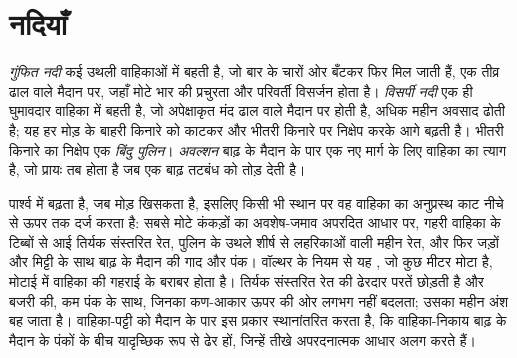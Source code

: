 \section{नदियाँ}\label{sec:b3:facies-models:rivers}

\begin{definition}[गुंफित और विसर्पी नदियाँ]\label{def:b3:facies-models:rivers}
\emph{गुंफित नदी} कई उथली वाहिकाओं में बहती है, जो बार के चारों ओर बँटकर फिर मिल जाती हैं,
एक तीव्र ढाल वाले मैदान पर, जहाँ मोटे भार की प्रचुरता और
परिवर्ती विसर्जन होता है। \emph{विसर्पी नदी}
एक ही घुमावदार वाहिका में बहती है, जो अपेक्षाकृत मंद ढाल वाले मैदान पर होती है,
अधिक महीन अवसाद ढोती है; यह हर मोड़ के बाहरी किनारे को काटकर
और भीतरी किनारे पर निक्षेप करके आगे बढ़ती है। भीतरी किनारे का निक्षेप एक \emph{बिंदु
पुलिन}। \emph{अवल्शन} बाढ़ के मैदान के पार एक नए मार्ग के लिए वाहिका का त्याग है,
जो प्रायः तब होता है जब एक बाढ़
तटबंध को तोड़ देती है।
\end{definition}

 पार्श्व में बढ़ता है, जब मोड़ खिसकता है, इसलिए किसी भी स्थान पर वह
वाहिका का अनुप्रस्थ काट नीचे से ऊपर तक दर्ज करता है: सबसे मोटे कंकड़ों का अवशेष-जमाव अपरदित आधार पर,
गहरी वाहिका के टिब्बों से आई तिर्यक संस्तरित रेत,
पुलिन के उथले शीर्ष से लहरिकाओं वाली महीन रेत, और फिर
जड़ों और मिट्टी के साथ बाढ़ के मैदान की गाद और पंक। वॉल्थर के नियम से यह
, जो कुछ मीटर मोटा है, मोटाई में
वाहिका की गहराई के बराबर होता है।  तिर्यक संस्तरित रेत की ढेरदार परतें छोड़ती है
और बजरी की, कम पंक के साथ, जिनका कण-आकार ऊपर की ओर लगभग नहीं बदलता; उसका महीन अंश
बह जाता है।  वाहिका-पट्टी को मैदान के पार इस प्रकार स्थानांतरित करता है,
कि वाहिका-निकाय बाढ़ के मैदान के पंकों के बीच यादृच्छिक रूप से ढेर हों, जिन्हें तीखे
अपरदनात्मक आधार अलग करते हैं।

